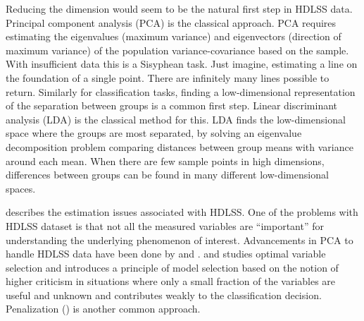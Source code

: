 
Reducing the dimension would seem to be the natural first step in HDLSS data. Principal component analysis (PCA) is the classical approach. PCA requires estimating the eigenvalues (maximum variance) and eigenvectors (direction of maximum variance) of the population variance-covariance based on the sample. With insufficient data this is a Sisyphean task. Just imagine, estimating a line on the foundation of a single point. There are infinitely many lines possible to return. Similarly for classification tasks, finding a low-dimensional representation of the separation between groups is a common first step. Linear discriminant analysis (LDA) is the classical method for this. LDA finds the low-dimensional space where the groups are most separated, by solving an eigenvalue decomposition problem comparing distances between group means with variance around each mean. When there are few sample points in high dimensions, differences between groups can be found in many different low-dimensional spaces. 




\cite{marron:2007} describes the estimation issues associated with HDLSS.  
One of the problems with HDLSS dataset is that not all the measured variables are ``important'' for understanding the underlying phenomenon of interest. Advancements in PCA to handle HDLSS data have been done by \cite{marron:2011} and \cite{yata:2010}. \cite{donoho:2009} and \cite{donoho:2008} studies optimal variable selection and introduces a principle of model selection based on the notion of higher criticism in situations where only a small fraction of the variables are useful and unknown and contributes weakly to the classification decision. Penalization (\cite{witten:2011}) is another common approach.


